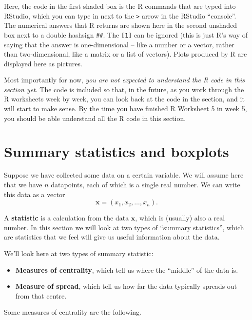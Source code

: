 \documentclass[
  a4paper,
]{book}
\providecommand{\tightlist}{%
  \setlength{\itemsep}{0pt}\setlength{\parskip}{0pt}}
\theoremstyle{definition}
\theoremstyle{definition}
\theoremstyle{definition}
\theoremstyle{remark}
\begin{document}
Here, the code in the first shaded box is the R commands that are typed into
RStudio, which you can type in next to the \texttt{\textgreater{}} arrow in the RStudio ``console''. The numerical answers that R returns are shown here in the second unshaded box next to a double hashsign \texttt{\#\#}. The \texttt{{[}1{]}} can be ignored (this is just R's way of saying that the answer is one-dimensional -- like a number or a vector, rather than two-dimensional, like a matrix or a list of vectors). Plots produced by R are displayed here as pictures.

Most importantly for now, \emph{you are not expected to understand the R code in this section yet}. The code is included so that, in the future, as you work through the R worksheets week by week, you can look back at the code in the section, and it will start to make sense. By the time you have finished R Worksheet 5 in week 5, you should be able understand all the R code in this section.

\hypertarget{summary-stat}{%
\section{Summary statistics and boxplots}\label{summary-stat}}

Suppose we have collected some data on a certain variable. We will assume here that we have \(n\) datapoints, each of which is a single real number. We can write this data as a vector
\[ \mathbf x = (x_1, x_2, \dots, x_n) . \]

A \textbf{statistic} is a calculation from the data \(\mathbf x\), which is (usually) also a real number. In this section we will look at two types of ``summary statistics'', which are statistics that we feel will give us useful information about the data.

We'll look here at two types of summary statistic:

\begin{itemize}
\tightlist
\item
  \textbf{Measures of centrality}, which tell us where the ``middle'' of the data is.
\item
  \textbf{Measure of spread}, which tell us how far the data typically spreads out from that centre.
\end{itemize}

Some measures of centrality are the following.
\end{document}
